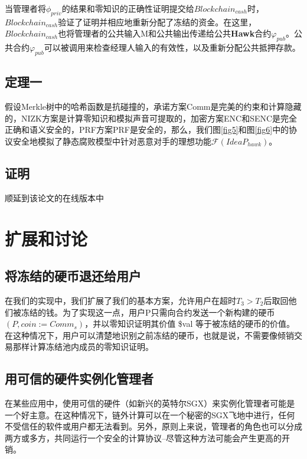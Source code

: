 \documentclass{xduugtrans}
\begin{document}
当管理者将$\phi _{priv}$的结果和零知识的正确性证明提交给$Blockchain_{cash}$时，$Blockchain_{cash}$验证了证明并相应地重新分配了冻结的资金。在这里，$Blockchain_{cash}$也将管理者的公共输入M和公共输出传递给公共\textbf{Hawk}合约$\varphi _{pub}$。公共合约$\varphi _{pub}$可以被调用来检查经理人输入的有效性，以及重新分配公共抵押存款。

\subsection{定理一}

假设Merkle树中的哈希函数是抗碰撞的，承诺方案Comm是完美的约束和计算隐藏的，NIZK方案是计算零知识和模拟声音可提取的，加密方案ENC和SENC是完全正确和语义安全的，PRF方案PRF是安全的，那么，我们图\ref{fig5}和图\ref{fig6}中的协议安全地模拟了静态腐败模型中针对恶意对手的理想功能$\mathcal{F} ( IdeaP _{hawk})$。

\subsection{证明}

顺延到该论文的在线版本中\cite{ref37}

\section{扩展和讨论}

\subsection{将冻结的硬币退还给用户}

在我们的实现中，我们扩展了我们的基本方案，允许用户在超时$T_3 > T_2$后取回他们被冻结的钱。为了实现这一点，用户P只需向合约发送一个新构建的硬币$(P,coin := Comm_s)$，并以零知识证明其价值 \$val 等于被冻结的硬币的价值。在这种情况下，用户可以清楚地识别之前冻结的硬币，也就是说，不需要像倾销交易那样计算冻结池内成员的零知识证明。

\subsection{用可信的硬件实例化管理者}

在某些应用中，使用可信的硬件（如新兴的英特尔SGX）来实例化管理者可能是一个好主意。在这种情况下，链外计算可以在一个秘密的SGX飞地中进行，任何不受信任的软件或用户都无法看到。另外，原则上来说，管理者的角色也可以分成两方或多方，共同运行一个安全的计算协议--尽管这种方法可能会产生更高的开销。
\end{document}
